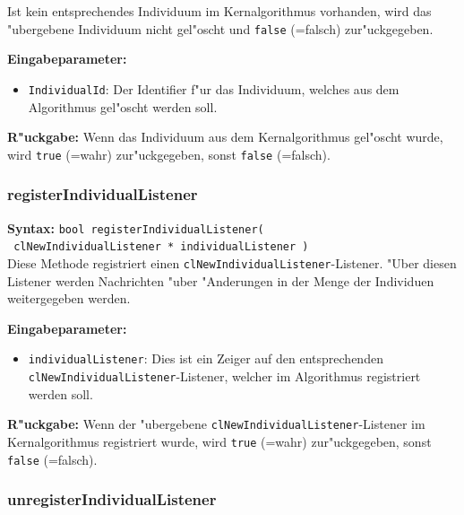 Ist kein entsprechendes Individuum im Kernalgorithmus vorhanden, wird das "ubergebene Individuum nicht gel"oscht und \verb|false| (=falsch) zur"uckgegeben.

\bigskip\noindent
\textbf{Eingabeparameter:}
\begin{itemize}
 \item \verb|IndividualId|: Der Identifier f"ur das Individuum, welches aus dem Algorithmus gel"oscht werden soll.
\end{itemize}

\bigskip\noindent
\textbf{R"uckgabe:} Wenn das Individuum aus dem Kernalgorithmus gel"oscht wurde, wird \verb|true| (=wahr) zur"uckgegeben, sonst \verb|false| (=falsch).



\subsubsection{registerIndividualListener}

\textbf{Syntax:} \verb|bool registerIndividualListener(| \\\verb| clNewIndividualListener * individualListener )| \\

Diese Methode registriert einen \verb|clNewIndividualListener|-Listener. "Uber diesen Listener werden Nachrichten "uber "Anderungen in der Menge der Individuen weitergegeben werden.

\bigskip\noindent
\textbf{Eingabeparameter:}
\begin{itemize}
 \item \verb|individualListener|: Dies ist ein Zeiger auf den entsprechenden \verb|clNewIndividualListener|-Listener, welcher im Algorithmus registriert werden soll.
\end{itemize}

\bigskip\noindent
\textbf{R"uckgabe:} Wenn der "ubergebene \verb|clNewIndividualListener|-Listener im Kernalgorithmus registriert wurde, wird \verb|true| (=wahr) zur"uckgegeben, sonst \verb|false| (=falsch).


\subsubsection{unregisterIndividualListener}

